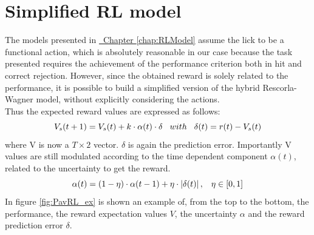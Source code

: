 \chapter{Simplified RL model}
\label{chap:SimpRL}
The models presented in \hyperref[chap:RLModel]{~Chapter \ref*{chap:RLModel}} assume the lick to be a functional action, which is absolutely reasonable in our case because the task presented requires the achievement of the performance criterion both in hit and correct rejection. However, since the obtained reward is solely related to the performance, it is possible to build a simplified version of the hybrid Rescorla-Wagner model, without explicitly considering the actions.\\Thus the expected reward values are expressed as follows:
\begin{equation}
V_s(t+1)=V_s(t)+k\cdot\alpha(t)\cdot\delta  \hspace{0.3cm} with \hspace{0.3cm}\delta(t)=r(t)-V_s(t)
\label{VValues}
\end{equation}
where V is now a $
T\times 2$ vector. $\delta$ is again the prediction error. Importantly V values are still modulated according to the time dependent component $\alpha(t)$, related to the uncertainty to get the reward.
\begin{equation}
    \alpha(t)=(1-\eta)\cdot\alpha(t-1)+\eta\cdot\left\lvert\delta(t)\right\rvert,\hspace{0.3cm} \eta\in[0,1]
\end{equation}
In figure \ref{fig:PavRL_ex} is shown an example of, from the top to the bottom, the performance, the reward expectation values $V$, the uncertainty $\alpha$ and the reward prediction error $\delta$.
